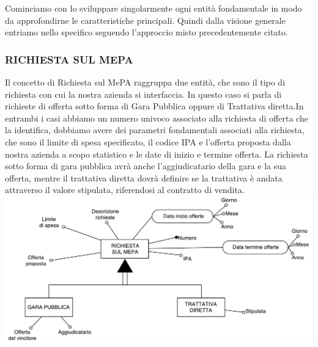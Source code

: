 Cominciamo con lo sviluppare singolarmente ogni entità fondamentale in modo da approfondirne le caratteristiche principali. Quindi dalla visione generale entriamo nello specifico seguendo l'approccio misto precedentemente citato.\newline

\subsubsection{RICHIESTA SUL MEPA}
Il concetto di Richiesta sul MePA raggruppa due entità, che sono il tipo di richiesta con cui la nostra azienda si interfaccia. In questo caso si parla di richieste di offerta sotto forma di Gara Pubblica oppure di Trattativa diretta.\newline In entrambi i casi abbiamo un numero univoco associato alla richiesta di offerta che la identifica, dobbiamo avere dei parametri fondamentali associati alla richiesta, che sono il limite di spesa specificato, il codice IPA e l'offerta proposta dalla nostra azienda a scopo statistico e le date di inizio e termine offerta.\newline
La richiesta sotto forma di gara pubblica avrà anche l'aggiudicatario della gara e la sua offerta, mentre il trattativa diretta dovrà definire se la trattativa è andata attraverso il valore stipulata, riferendosi al contratto di vendita.\newline 
\includegraphics[width=0.7\linewidth]{./immagini/richiesta_sul_mepa.pdf}

